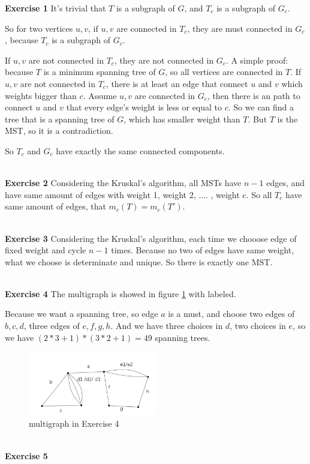 \documentclass{article}
\title{Homework #3}
\author{Coffee Automaton}
\date{September 2019}
\begin{document}
\maketitle

\textbf{Exercise 1}
It's trivial that $T$ is a subgraph of $G$, and $T_{c}$ is a subgraph of $G_{c}$.

So for two vertices $u,v$, if $u,v$ are connected in $T_{c}$, they are must connected in $G_{c}$, because $T_{c}$ is a subgraph of $G_{c}$.

If $u,v$ are not connected in $T_{c}$, they are not connected in $G_{c}$. A simple proof: because $T$ is a minimum spanning tree of $G$, so all vertices are connected in $T$. If $u,v$ are not connected in $T_{c}$, there is at least an edge that connect $u$ and $v$ which weights bigger than $c$. Assume $u,v$ are connected in $G_{c}$, then there is an path to connect $u$ and $v$ that every edge's weight is less or equal to $c$. So we can find a tree that is a spanning tree of $G$, which has smaller weight than $T$. But $T$ is the MST, so it is a contradiction.

So $T_c$ and $G_c$ have exactly the same connected components. 


~\\
\textbf{Exercise 2}
Considering the Kruskal's algorithm, all MSTs have $n-1$ edges, and have same amount of edges with weight 1, weight 2, .... , weight c. So all $T_c$ have same amount of edges, that $m_{c}(T) = m_{c}(T')$.

~\\
\textbf{Exercise 3}
Considering the Kruskal's algorithm, each time we chooose edge of fixed weight and cycle $n-1$ times. Because no two of edges have same weight, what we choose is determinate and unique. So there is exactly one MST.

~\\
\textbf{Exercise 4}
The multigraph is showed in figure \ref{img} with labeled.

Because we want a spanning tree, so edge $a$ is a must, and choose two edges of $b,c,d$, three edges of $e,f,g,h$. And we have three choices in $d$, two choices in $e$, so we have 
$(2*3 + 1)*(3*2 + 1) = 49$ spanning trees.


\begin{figure}
		\centering
		\includegraphics[width=0.5\textwidth]{3.png}
		\caption{
		multigraph in Exercise 4} 
		\label{img}
	\end{figure}

~\\
\textbf{Exercise 5}
\end{document}
